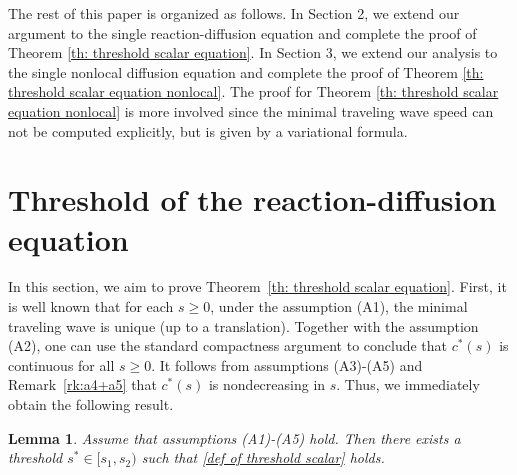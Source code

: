 \documentclass[11pt,a4paper]{article}
\newtheorem{lemma}[theorem]{\textbf{Lemma}}
\numberwithin{equation}{section}
\numberwithin{figure}{section}
\begin{document}
The rest of this paper is organized as follows. 
In Section 2, we extend our argument to the single reaction-diffusion equation and complete the proof of Theorem \ref{th: threshold scalar equation}. In Section 3, we extend our analysis to the single nonlocal diffusion equation and complete the proof of Theorem \ref{th: threshold scalar equation nonlocal}. The proof for Theorem \ref{th: threshold scalar equation nonlocal} is more involved since the minimal traveling wave speed can not be computed explicitly, but is given by a variational formula. 









\section{Threshold of the reaction-diffusion equation}\label{sec:threshold scalar}


In this section, we aim to prove Theorem~\ref{th: threshold scalar equation}.
First, it is well known that for each $s\geq0$, under the assumption  (A1), the minimal traveling wave is unique (up to a translation).
Together with the assumption (A2), one can use the standard compactness argument to conclude that $c^*(s)$ is continuous for all $s\ge 0$.
It follows from assumptions (A3)-(A5) and Remark~\ref{rk:a4+a5} that $c^*(s)$ is nondecreasing in $s$. Thus, we immediately obtain the following result.

\begin{lemma}\label{lem: th1-part1}
Assume that assumptions (A1)-(A5) hold. Then there exists a threshold $s^*\in[s_1,s_2)$ such that \eqref{def of threshold scalar} holds.
\end{lemma}
\end{document}
